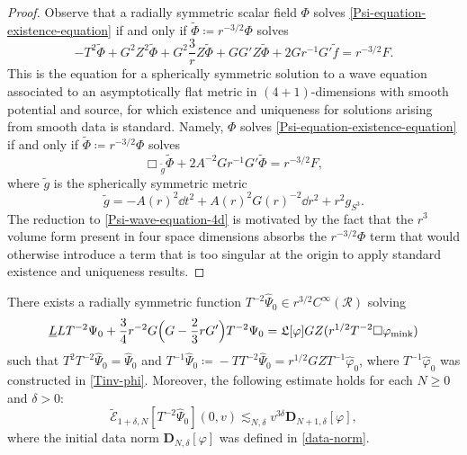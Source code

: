 \documentclass[10pt, reqno]{amsart}
\begin{document}
\begin{proof}
Observe that a radially symmetric scalar field \(\Phi{}\) solves
\cref{Psi-equation-existence-equation} if and only if \(\tilde{\Phi{}} \coloneqq{}r^{-3/2}\Phi{}\)
solves
\begin{equation}
-T^2\tilde{\Phi{}} + G^2Z^2\tilde{\Phi{}} + G^2\frac{3}{r}Z\tilde{\Phi{}} + GG'Z\tilde{\Phi{}} + 2Gr^{-1}G'\tilde{f} = r^{-3/2}F.
\end{equation}
This is the equation for a spherically symmetric solution to a wave equation
associated to an asymptotically flat metric in \((4 + 1)\)-dimensions with smooth
potential and source, for which existence and uniqueness for solutions arising
from smooth data is standard. Namely, \(\Phi{}\) solves
\cref{Psi-equation-existence-equation} if and only if \(\tilde{\Phi{}} \coloneqq{}r^{-3/2}\Phi{}\)
solves
\begin{equation}\label{Psi-wave-equation-4d}
\Box{}_{\tilde{g}}\tilde{\Phi{}} + 2A^{-2}Gr^{-1}G'\tilde{\Phi{}} = r^{-3/2}F,
\end{equation}
where \(\tilde{g}\) is the spherically symmetric metric
\begin{equation}
\tilde{g} = -A(r)^2\dd{}t^2 + A(r)^2G(r)^{-2}\dd{}r^2 + r^2g_{S^3}.
\end{equation}
The reduction to \cref{Psi-wave-equation-4d} is motivated by the fact that the
\(r^3\) volume form present in four space dimensions absorbs the
\(r^{-3/2}\Phi{}\) term that would otherwise introduce a term that is too
singular at the origin to apply standard existence and uniqueness results.
\end{proof}
\begin{proposition}
There exists a radially symmetric function \(T^{-2}\widehat{\Psi{}}_0\in
r^{3/2}C^\infty(\mathcal{R})\) solving
\begin{equation}\label{Tinv-Psi-equation}
\underline{L}LT^{-2}\Psi{}_0 + \frac{3}{4}r^{-2}G\Bigl(G - \frac{2}{3}rG'\Bigr)T^{-2}\Psi{}_0 = \mathfrak{L}[\varphi{}]GZ(r^{1/2}T^{-2}\Box{}\varphi{}_{\textnormal{mink}})
\end{equation}
such that \(T^2T^{-2}\widehat{\Psi{}}_0 = \widehat{\Psi{}}_0\) and
\(T^{-1}\widehat{\Psi{}}_0\coloneqq{}-TT^{-2}\widehat{\Psi{}}_0 =
r^{1/2}GZT^{-1}\widehat{\varphi{}}_0\), where \(T^{-1}\widehat{\varphi{}}_0\)
was constructed in \cref{Tinv-phi}. Moreover, the following estimate holds for
each \(N\ge 0\) and \(\delta{} > 0\):
\begin{equation}\label{Tinv-Psi-estimate}
\tilde{\mathcal{E}}_{1+\delta{},N}[T^{-2}\widehat{\Psi{}}_0](0,v)\lesssim_{N,\delta{}} v^{3\delta{}} \mathbf{D}_{N+1,\delta{}}{}[\varphi{}],
\end{equation}
where the initial data norm \(\mathbf{D}_{N,\delta{}}[\varphi{}]\) was defined in \cref{data-norm}.
\label{Tinv-Psi}
\end{proposition}
\end{document}
